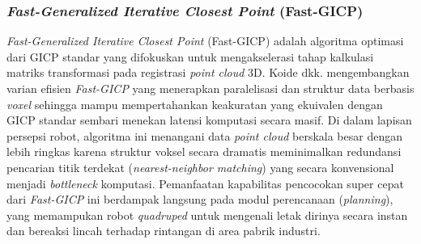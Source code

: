 
\subsubsection{\textit{Fast-Generalized Iterative Closest Point} (Fast-GICP)}
\textit{Fast-Generalized Iterative Closest Point} (Fast-GICP) adalah algoritma optimasi dari GICP standar yang difokuskan untuk mengakselerasi tahap kalkulasi matriks transformasi pada registrasi \textit{point cloud} 3D. Koide dkk. \cite{koide2021voxelized} mengembangkan varian efisien \textit{Fast-GICP} yang menerapkan paralelisasi dan struktur data berbasis \textit{voxel} sehingga mampu mempertahankan keakuratan yang ekuivalen dengan GICP standar sembari menekan latensi komputasi secara masif. Di dalam lapisan persepsi robot, algoritma ini menangani data \textit{point cloud} berskala besar dengan lebih ringkas karena struktur voksel secara dramatis meminimalkan redundansi pencarian titik terdekat (\textit{nearest-neighbor matching}) yang secara konvensional menjadi \textit{bottleneck} komputasi. Pemanfaatan kapabilitas pencocokan super cepat dari \textit{Fast-GICP} ini berdampak langsung pada modul perencanaan (\textit{planning}), yang memampukan robot \textit{quadruped} untuk mengenali letak dirinya secara instan dan bereaksi lincah terhadap rintangan di area pabrik industri.


